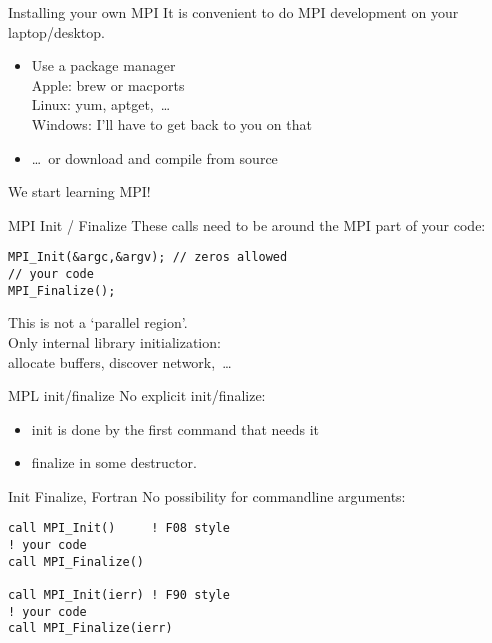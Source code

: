 \begin{numberedframe}{Installing your own MPI}
  It is convenient to do MPI development on your laptop/desktop.
  \begin{itemize}
  \item Use a package manager\\
    Apple: brew or macports\\
    Linux: yum, aptget,~\ldots\\
    Windows: I'll have to get back to you on that
  \item \ldots~or download and compile from source 
  \end{itemize}
\end{numberedframe}

 {We start learning MPI!}

\begin{numberedframe}{MPI Init / Finalize}
 These calls need to be around the MPI part of your code:
\lstset{language=C}
\begin{lstlisting}
MPI_Init(&argc,&argv); // zeros allowed
// your code
MPI_Finalize();  
\end{lstlisting}
This is not a `parallel region'.\\
Only internal library initialization:\\
allocate buffers, discover network,~\ldots
\end{numberedframe}

\begin{mpl}
  \addtocounter{slidecount}{-1}
\begin{numberedframe}{MPL init/finalize}
    No explicit init/finalize:
    \begin{itemize}
    \item init is done by the first command that needs it
    \item finalize in some destructor.
    \end{itemize}
\end{numberedframe}
\end{mpl}

\begin{fortran}
  \addtocounter{slidecount}{-1}
\begin{numberedframe}{Init Finalize, Fortran}
No possibility for commandline arguments:
\lstset{language=Fortran}
\begin{lstlisting}
call MPI_Init()     ! F08 style
! your code
call MPI_Finalize()

call MPI_Init(ierr) ! F90 style
! your code
call MPI_Finalize(ierr)
\end{lstlisting}  
\end{numberedframe}
\end{fortran}

